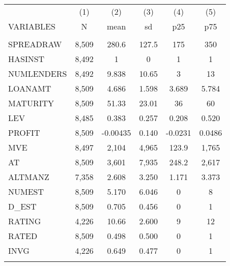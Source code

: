 \begin{tabular}{lccccc} \hline
 & (1) & (2) & (3) & (4) & (5) \\
VARIABLES & N & mean & sd & p25 & p75 \\ \hline
 &  &  &  &  &  \\
SPREADRAW & 8,509 & 280.6 & 127.5 & 175 & 350 \\
HASINST & 8,492 & 1 & 0 & 1 & 1 \\
NUMLENDERS & 8,492 & 9.838 & 10.65 & 3 & 13 \\
LOANAMT & 8,509 & 4.686 & 1.598 & 3.689 & 5.784 \\
MATURITY & 8,509 & 51.33 & 23.01 & 36 & 60 \\
LEV & 8,485 & 0.383 & 0.257 & 0.208 & 0.520 \\
PROFIT & 8,509 & -0.00435 & 0.140 & -0.0231 & 0.0486 \\
MVE & 8,497 & 2,104 & 4,965 & 123.9 & 1,765 \\
AT & 8,509 & 3,601 & 7,935 & 248.2 & 2,617 \\
ALTMANZ & 7,358 & 2.608 & 3.250 & 1.171 & 3.373 \\
NUMEST & 8,509 & 5.170 & 6.046 & 0 & 8 \\
D\_EST & 8,509 & 0.705 & 0.456 & 0 & 1 \\
RATING & 4,226 & 10.66 & 2.600 & 9 & 12 \\
RATED & 8,509 & 0.498 & 0.500 & 0 & 1 \\
INVG & 4,226 & 0.649 & 0.477 & 0 & 1 \\
 &  &  &  &  &  \\ \hline
\end{tabular}
